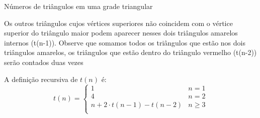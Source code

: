 \begin{exemplo}{Números de triângulos em uma grade triangular}
\begin{center}
  \end{center}
  
Os outros triângulos cujos vértices superiores não coincidem com o vértice superior do triângulo maior podem aparecer nesses dois triângulos amarelos internos (t(n-1)). Observe que somamos todos os triângulos que estão nos dois triângulos amarelos, os triângulos que estão dentro do triângulo vermelho (t(n-2)) serão contados duas vezes




\begin{center}
\end{center}

A definição recursiva de $t(n)$ é:
$$
t(n) =
\begin{cases}
1  & n = 1 \\
4  & n = 2 \\
n + 2 \cdot t(n-1) - t(n-2) & n \geq 3\\
\end{cases}
$$

\end{exemplo}


